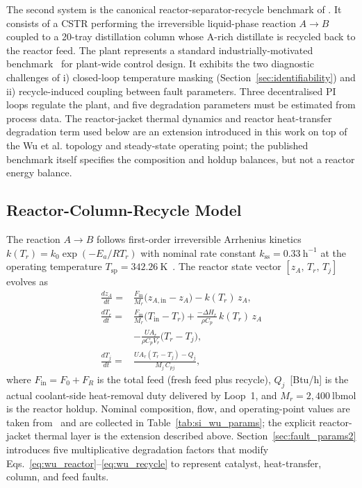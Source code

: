 \documentclass[aps,pre,twocolumn,superscriptaddress,floatfix]{revtex4-2}
\begin{document}
The second system is the canonical reactor-separator-recycle benchmark of \citet{Wu2003,Larsson2003,GYASI2025140,Seki2008}. It consists of a CSTR performing the irreversible liquid-phase reaction
$A \to B$ coupled to a 20-tray distillation column whose A-rich distillate is recycled back to the reactor feed. The plant represents a standard industrially-motivated benchmark~\citep{Luyben1993,Luyben1994,LuybenTyreus1997} for plant-wide control design. It exhibits the two diagnostic challenges of i) closed-loop temperature masking (Section~\ref{sec:identifiability}) and ii) recycle-induced coupling between fault parameters. Three decentralised PI loops regulate the plant, and five degradation parameters must be estimated from process data. The reactor-jacket thermal dynamics and reactor heat-transfer degradation term used below are an extension introduced in this work on top of the Wu et al. topology and steady-state operating point; the published benchmark itself specifies the composition and holdup balances, but not a reactor energy balance.

\subsection{Reactor-Column-Recycle Model}

The reaction $A \to B$ follows first-order irreversible Arrhenius kinetics $k(T_r) = k_0\exp(-E_a/RT_r)$ with nominal rate constant $k_\mathrm{ss} = 0.33~\mathrm{h}^{-1}$ at the operating temperature $T_\mathrm{sp} = 342.26~\mathrm{K}$~\citep{Wu2003}. The reactor state vector $[z_A,\,T_r,\,T_j]$ evolves as
%
\begin{subequations}
\label{eq:wu_reactor}
\begin{align}
  \frac{dz_A}{dt}
    =& \frac{F_\mathrm{in}}{M_r}\bigl(z_{A,\mathrm{in}} - z_A\bigr)
       - k(T_r)\,z_A,
  \label{eq:wu_dza} \\[4pt]
  \frac{dT_r}{dt}
    =& \frac{F_\mathrm{in}}{M_r}\bigl(T_\mathrm{in} - T_r\bigr)
       + \frac{-\Delta H_r}{\rho C_p}\,k(T_r)\,z_A \nonumber \\
    & - \frac{U\!A_r}{\rho C_p V_r}\bigl(T_r - T_j\bigr),
  \label{eq:wu_dtr} \\[4pt]
  \frac{dT_j}{dt}
    =& \frac{U\!A_r(T_r - T_j) - Q_j}{M_j\,C_{pj}},
  \label{eq:wu_dtj}
\end{align}
\end{subequations}
%
where $F_\mathrm{in} = F_0 + F_R$ is the total feed (fresh feed plus recycle), $Q_j$~[Btu/h] is the actual coolant-side heat-removal duty delivered by Loop~1, and $M_r = 2{,}400~\mathrm{lbmol}$ is the reactor holdup. Nominal composition, flow, and operating-point values are taken from~\citet[Table~1]{Wu2003} and are collected in Table~\ref{tab:si_wu_params}; the explicit reactor-jacket thermal layer is the extension described above. Section~\ref{sec:fault_params2} introduces five multiplicative degradation factors that modify Eqs.~\eqref{eq:wu_reactor}--\eqref{eq:wu_recycle} to represent catalyst, heat-transfer, column, and feed faults.
\end{document}
